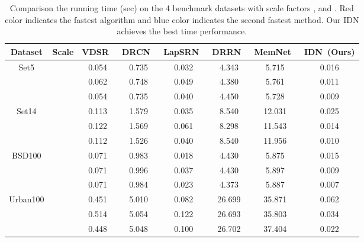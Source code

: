 \documentclass[10pt,twocolumn,letterpaper]{article}
\begin{document}
\begin{table*}[htb]
	\small
	\centering
	\begin{tabular}{|c|c|c|c|c|c|c||c|}
		\hline
		Dataset & Scale & VDSR~\cite{VDSR} & DRCN~\cite{DRCN} & LapSRN~\cite{LapSRN} & DRRN~\cite{DRRN} & MemNet~\cite{MemNet} & IDN~(Ours) \\
		\hline
		\hline
		\multirow{3}{*}{Set5} &  & 0.054 & 0.735 & \textcolor[rgb]{0.00,0.07,1.00}{0.032} & 4.343 & 5.715 & \textcolor[rgb]{1.00,0.00,0.00}{0.016} \\
		&  & 0.062 & 0.748 & \textcolor[rgb]{0.00,0.07,1.00}{0.049} & 4.380 & 5.761 & \textcolor[rgb]{1.00,0.00,0.00}{0.011} \\
		&  & 0.054 & 0.735 & \textcolor[rgb]{0.00,0.07,1.00}{0.040} & 4.450 & 5.728 & \textcolor[rgb]{1.00,0.00,0.00}{0.009} \\
		\hline
		\hline
		\multirow{3}{*}{Set14} &  & 0.113 & 1.579 & \textcolor[rgb]{0.00,0.07,1.00}{0.035} & 8.540 & 12.031 & \textcolor[rgb]{1.00,0.00,0.00}{0.025} \\
		&  & 0.122 & 1.569 & \textcolor[rgb]{0.00,0.07,1.00}{0.061} & 8.298 & 11.543 & \textcolor[rgb]{1.00,0.00,0.00}{0.014} \\
		
		&  & 0.112 & 1.526 & \textcolor[rgb]{0.00,0.07,1.00}{0.040} & 8.540 & 11.956 & \textcolor[rgb]{1.00,0.00,0.00}{0.010} \\
		\hline
		\hline
		\multirow{3}{*}{BSD100} &  & 0.071 & 0.983 & \textcolor[rgb]{0.00,0.07,1.00}{0.018} & 4.430 & 5.875 & \textcolor[rgb]{1.00,0.00,0.00}{0.015} \\
		&  & 0.071 & 0.996 & \textcolor[rgb]{0.00,0.07,1.00}{0.037} & 4.430 & 5.897 & \textcolor[rgb]{1.00,0.00,0.00}{0.009} \\
		&  & 0.071 & 0.984 & \textcolor[rgb]{0.00,0.07,1.00}{0.023} & 4.373 & 5.887 & \textcolor[rgb]{1.00,0.00,0.00}{0.007} \\
		\hline
		\hline
		\multirow{3}{*}{Urban100} &  & 0.451 & 5.010 & \textcolor[rgb]{0.00,0.07,1.00}{0.082} & 26.699 & 35.871 & \textcolor[rgb]{1.00,0.00,0.00}{0.062} \\
		&  & 0.514 & 5.054 & \textcolor[rgb]{0.00,0.07,1.00}{0.122} & 26.693 & 35.803 & \textcolor[rgb]{1.00,0.00,0.00}{0.034} \\
		
		&  & 0.448 & 5.048 & \textcolor[rgb]{0.00,0.07,1.00}{0.100} & 26.702 & 37.404 & \textcolor[rgb]{1.00,0.00,0.00}{0.022} \\
		
		\hline
	\end{tabular}
	\caption{Comparison the running time (sec) on the 4 benchmark datasets with scale factors ,  and . Red color indicates the fastest algorithm and blue color indicates the second fastest method. Our IDN achieves the best time performance.}
	\label{tab:time}
\end{table*}
\end{document}
